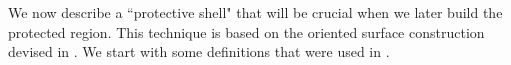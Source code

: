 \documentclass{article}
\renewcommand{\P}{\mathbb{P}}
\numberwithin{equation}{section}
\begin{document}

We now describe a ``protective shell" that will be crucial when we later build the protected region.
This technique is based on the oriented surface construction devised in \cite{LipPerc, GrimmettHolroyd10, GrimmettHolroyd12}.
We start with some definitions that were used in \cite{GS2020, GravnerHolroydSivakoff}.
\end{document}
